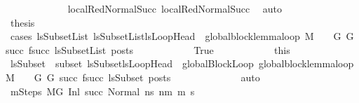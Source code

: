 \begin{isabellebody}
\ \ \ \ \ \ \ \ \ \ \isamarkupfalse%
\ {\isachardoublequoteopen}{}{\isachardoublequoteclose}{\isacharparenleft}{\kern0pt}{}{\isacharparenright}{\kern0pt}\ local{\isachardot}{\kern0pt}RedNormalSucc{\isacharparenleft}{\kern0pt}{}{\isacharparenright}{\kern0pt}\ local{\isachardot}{\kern0pt}RedNormalSucc{\isacharparenleft}{\kern0pt}{}{\isacharparenright}{\kern0pt}\ \isamarkupfalse%
\ auto\isanewline
\ \ \ \ \ \ \ \ \isamarkupfalse%
\ \isamarkupfalse%
\ {\isacharquery}{\kern0pt}thesis\ \isanewline
\ \ \ \ \ \ \ \ \isamarkupfalse%
\ {\isacharparenleft}{\kern0pt}cases\ {\isachardoublequoteopen}{\isasymexists}lsSubsetList{\isachardot}{\kern0pt}\ lsSubsetList{\isasymsubseteq}lsLoopHead\ {\isasymand}\ global{\isacharunderscore}{\kern0pt}block{\isacharunderscore}{\kern0pt}lemma{\isacharunderscore}{\kern0pt}loop\ M\ {\isasymLambda}\ {\isasymGamma}\ {\isasymOmega}\ G\ G{\isacharprime}{\kern0pt}\ succ\ {\isacharparenleft}{\kern0pt}f{\isacharparenleft}{\kern0pt}succ{\isacharparenright}{\kern0pt}{\isacharparenright}{\kern0pt}\ lsSubsetList\ posts{\isachardoublequoteclose}{\isacharparenright}{\kern0pt}\isanewline
\ \ \ \ \ \ \ \ \ \ \isamarkupfalse%
\ True\isanewline
\ \ \ \ \ \ \ \ \ \ \isamarkupfalse%
\ this\ \isamarkupfalse%
\ lsSubset\ \ subset{\isacharcolon}{\kern0pt}\ {\isachardoublequoteopen}lsSubset{\isasymsubseteq}lsLoopHead{\isachardoublequoteclose}\ \ globalBlockLoop{\isacharcolon}{\kern0pt}\ {\isachardoublequoteopen}global{\isacharunderscore}{\kern0pt}block{\isacharunderscore}{\kern0pt}lemma{\isacharunderscore}{\kern0pt}loop\ M\ {\isasymLambda}\ {\isasymGamma}\ {\isasymOmega}\ G\ G{\isacharprime}{\kern0pt}\ succ\ {\isacharparenleft}{\kern0pt}f{\isacharparenleft}{\kern0pt}succ{\isacharparenright}{\kern0pt}{\isacharparenright}{\kern0pt}\ lsSubset\ posts{\isachardoublequoteclose}\isanewline
\ \ \ \ \ \ \ \ \ \ \ \ \isamarkupfalse%
\ auto\isanewline
\ \ \isanewline
\ \ \ \ \ \ \ \ \ \ \isamarkupfalse%
\ mSteps{\isacharcolon}{\kern0pt}\ {\isachardoublequoteopen}M{\isacharcomma}{\kern0pt}{\isasymLambda}{\isacharcomma}{\kern0pt}{\isasymGamma}{\isacharcomma}{\kern0pt}{\isasymOmega}{\isacharcomma}{\kern0pt}G\ {\isasymturnstile}{\isacharparenleft}{\kern0pt}Inl\ succ{\isacharcomma}{\kern0pt}\ Normal\ ns{\isacharprime}{\kern0pt}{\isacharparenright}{\kern0pt}\ {\isacharminus}{\kern0pt}n{\isasymrightarrow}{\isacharcircum}{\kern0pt}m\ {\isacharparenleft}{\kern0pt}m{\isacharprime}{\kern0pt}{\isacharcomma}{\kern0pt}\ s{\isacharprime}{\kern0pt}{\isacharparenright}{\kern0pt}{\isachardoublequoteclose}\isanewline

\end{isabellebody}
